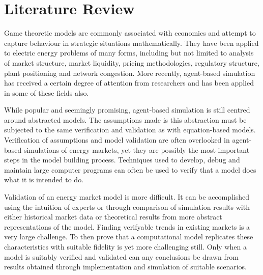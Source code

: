 \section{Literature Review}
Game theoretic models are commonly associated with economics and attempt to
capture behaviour in strategic situations mathematically.  They have been
applied to electric energy problems of many forms, including but not limited
to analysis of market structure, market liquidity, pricing methodologies,
regulatory structure, plant positioning and network congestion.  More
recently, agent-based simulation has received a certain degree of attention
from researchers and has been applied in some of these fields also.

While popular and seemingly promising, agent-based simulation is still centred
around abstracted models.  The assumptions made is this abstraction must be
subjected to the same verification and validation as with equation-based
models.  Verification of assumptions and model validation are often overlooked
in agent-based simulations of energy markets, yet they are possibly the most
important steps in the model building process.  Techniques used to develop,
debug and maintain large computer programs can often be used to verify that a
model does what it is intended to do.

Validation of an energy market model is more difficult.  It can be accomplished
using the intuition of experts or through comparison of simulation results
with either historical market data or theoretical results from more abstract
representations of the model.  Finding verifyable trends in existing markets
is a very large challenge.  To then prove that a computational model
replicates these characteristics with suitable fidelity is yet more
challenging still.  Only when a model is suitably verified and validated can
any conclusions be drawn from results obtained through implementation and
simulation of suitable scenarios.